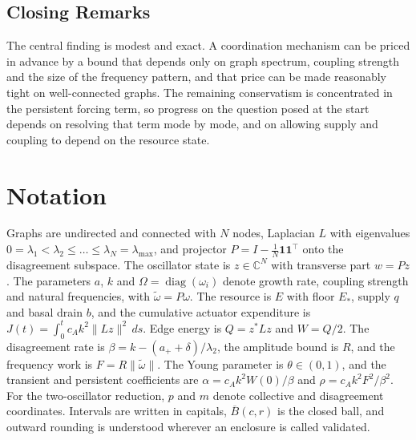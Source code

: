 \documentclass[11pt,notitlepage]{report}
\theoremstyle{definition}
\theoremstyle{remark}
\newcommand{\C}{\mathbb C}
\newcommand{\one}{\mathbf 1}
\newcommand{\cA}{c_A}
\newcommand{\lmax}{\lambda_{\max}}
\begin{document}
\section{Closing Remarks}
The central finding is modest and exact. A coordination mechanism can be priced in advance by a bound that depends only on graph spectrum, coupling strength and the size of the frequency pattern, and that price can be made reasonably tight on well-connected graphs. The remaining conservatism is concentrated in the persistent forcing term, so progress on the question posed at the start depends on resolving that term mode by mode, and on allowing supply and coupling to depend on the resource state.
\appendix

\chapter{Notation}\label{app:notation}
Graphs are undirected and connected with $N$ nodes, Laplacian $L$ with eigenvalues $0=\lambda_1<\lambda_2\le\dots\le\lambda_N=\lmax$, and projector $P=I-\tfrac1N\one\one^\top$ onto the disagreement subspace. The oscillator state is $z\in\C^N$ with transverse part $w=Pz$. The parameters $a$, $k$ and $\Omega=\operatorname{diag}(\omega_i)$ denote growth rate, coupling strength and natural frequencies, with $\tilde\omega=P\omega$. The resource is $E$ with floor $E_*$, supply $q$ and basal drain $b$, and the cumulative actuator expenditure is $J(t)=\int_0^t\cA k^2\|Lz\|^2\,ds$. Edge energy is $Q=z^*Lz$ and $W=Q/2$. The disagreement rate is $\beta=k-(a_++\delta)/\lambda_2$, the amplitude bound is $R$, and the frequency work is $F=R\|\tilde\omega\|$. The Young parameter is $\theta\in(0,1)$, and the transient and persistent coefficients are $\alpha=\cA k^2W(0)/\beta$ and $\rho=\cA k^2F^2/\beta^2$. For the two-oscillator reduction, $p$ and $m$ denote collective and disagreement coordinates. Intervals are written in capitals, $\overline B(c,r)$ is the closed ball, and outward rounding is understood wherever an enclosure is called validated.
\end{document}
